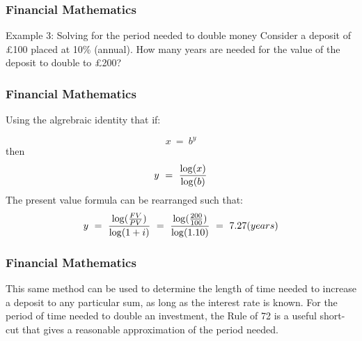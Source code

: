 \documentclass{beamer}
\begin{document}
\begin{frame}
\frametitle{Financial Mathematics}
Example 3: Solving for the period needed to double money
Consider a deposit of £100 placed at 10\% (annual). How many years are needed for the value of the deposit to double to £200?
\end{frame}
\begin{frame}
\frametitle{Financial Mathematics}
Using the algrebraic identity that if:

\[x \ = \ b^y \]  
then
\[y \ = \ {\log (x) \over \log(b)}\]  
The present value formula can be rearranged such that:
\[y \ = \ {\log ({FV \over PV}) \over \log (1+i)} \ = \  {\log ({200 \over 100}) \over \log (1.10)} \ =\ 7.27   {(years)} 
\] 
\end{frame}
\begin{frame}
\frametitle{Financial Mathematics}
This same method can be used to determine the length of time needed to increase a deposit to any particular sum, as long as the interest rate is known. For the period of time needed to double an investment, the Rule of 72 is a useful short-cut that gives a reasonable approximation of the period needed.
\end{frame}
\end{document}
